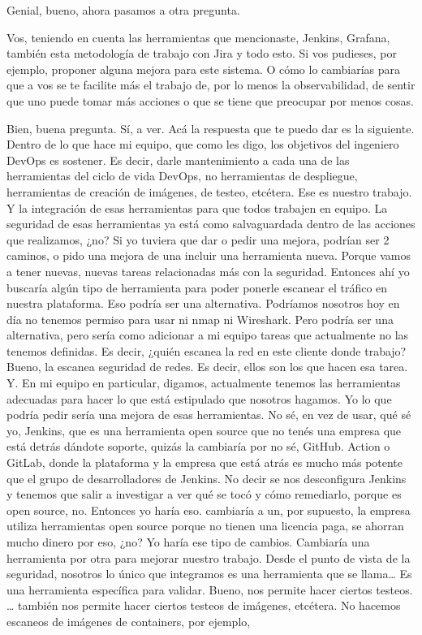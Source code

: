 \begin{description}[leftmargin=0cm, labelsep=0.5cm]
    \item[\textbf{MUNTAABSKI FEDERICO:}] Genial, bueno, ahora pasamos a otra pregunta.

    \item[\textbf{MUNTAABSKI FEDERICO:}] Vos, teniendo en cuenta las herramientas que mencionaste, Jenkins, Grafana, también esta metodología de trabajo con Jira y todo esto. Si vos pudieses, por ejemplo, proponer alguna mejora para este sistema. O cómo lo cambiarías para que a vos se te facilite más el trabajo de, por lo menos la observabilidad, de sentir que uno puede tomar más acciones o que se tiene que preocupar por menos cosas.

    \item[\textbf{VILLARINO PABLO RODOLFO:}] Bien, buena pregunta. Sí, a ver. Acá la respuesta que te puedo dar es la siguiente. Dentro de lo que hace mi equipo, que como les digo, los objetivos del ingeniero DevOps es sostener. Es decir, darle mantenimiento a cada una de las herramientas del ciclo de vida DevOps, no herramientas de despliegue, herramientas de creación de imágenes, de testeo, etcétera. Ese es nuestro trabajo. Y la integración de esas herramientas para que todos trabajen en equipo. La seguridad de esas herramientas ya está como salvaguardada dentro de las acciones que realizamos, ¿no? Si yo tuviera que dar o pedir una mejora, podrían ser 2 caminos, o pido una mejora de una incluir una herramienta nueva. Porque vamos a tener nuevas, nuevas tareas relacionadas más con la seguridad. Entonces ahí yo buscaría algún tipo de herramienta para poder ponerle escanear el tráfico en nuestra plataforma. Eso podría ser una alternativa. Podríamos nosotros hoy en día no tenemos permiso para usar ni nmap ni Wireshark. Pero podría ser una alternativa, pero sería como adicionar a mi equipo tareas que actualmente no las tenemos definidas. Es decir, ¿quién escanea la red en este cliente donde trabajo? Bueno, la escanea seguridad de redes. Es decir, ellos son los que hacen esa tarea. Y. En mi equipo en particular, digamos, actualmente tenemos las herramientas adecuadas para hacer lo que está estipulado que nosotros hagamos. Yo lo que podría pedir sería una mejora de esas herramientas. No sé, en vez de usar, qué sé yo, Jenkins, que es una herramienta open source que no tenés una empresa que está detrás dándote soporte, quizás la cambiaría por no sé, GitHub. Action o GitLab, donde la plataforma y la empresa que está atrás es mucho más potente que el grupo de desarrolladores de Jenkins. No decir se nos desconfigura Jenkins y tenemos que salir a investigar a ver qué se tocó y cómo remediarlo, porque es open source, no. Entonces yo haría eso. cambiaría a un, por supuesto, la empresa utiliza herramientas open source porque no tienen una licencia paga, se ahorran mucho dinero por eso, ¿no? Yo haría ese tipo de cambios. Cambiaría una herramienta por otra para mejorar nuestro trabajo. Desde el punto de vista de la seguridad, nosotros lo único que integramos es una herramienta que se llama… Es una herramienta específica para validar. Bueno, nos permite hacer ciertos testeos. … también nos permite hacer ciertos testeos de imágenes, etcétera. No hacemos escaneos de imágenes de containers, por ejemplo, 
\end{description}
